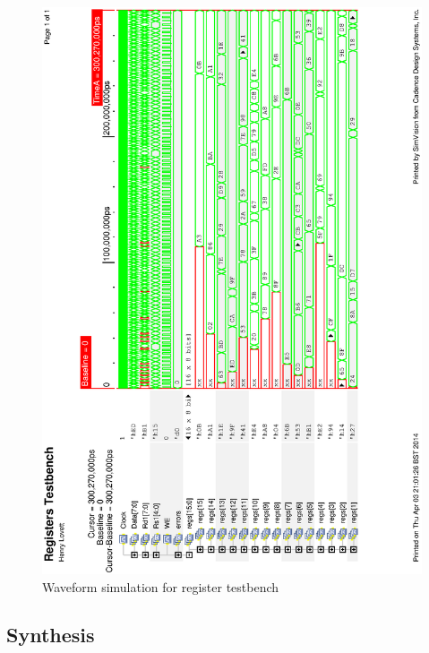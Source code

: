 \begin{figure}
\includegraphics[width=\textwidth,height=\textheight]{Figures/registerssim.eps}
\caption{Waveform simulation for register testbench}
\label{fig:regsim}
\end{figure}

\subsection{Synthesis}
